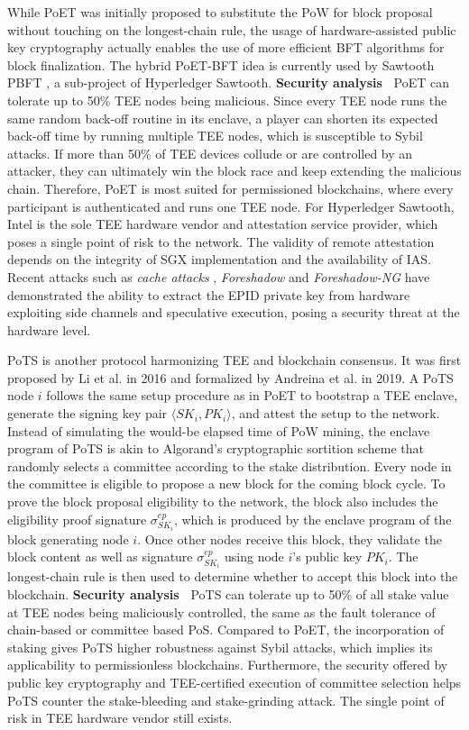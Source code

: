 While PoET was initially proposed to substitute the PoW for block proposal without touching on the longest-chain rule, the usage of hardware-assisted public key cryptography actually enables the use of more efficient BFT algorithms for block finalization. The hybrid PoET-BFT idea is currently used by Sawtooth PBFT , a sub-project of Hyperledger Sawtooth.
\textbf{Security analysis~} PoET can tolerate up to 50\% TEE nodes being malicious. Since every TEE node runs the same random back-off routine in its enclave, a player can shorten its expected back-off time by running multiple TEE nodes, which is susceptible to Sybil attacks. If more than 50\% of TEE devices collude or are controlled by an attacker, they can ultimately win the block race and keep extending the malicious chain. Therefore, PoET is most suited for permissioned blockchains, where every participant is authenticated and runs one TEE node.
For Hyperledger Sawtooth, Intel is the sole TEE hardware vendor and attestation service provider, which poses a single point of risk to the network. The validity of remote attestation depends on the integrity of SGX implementation and the availability of IAS. Recent attacks such as \textit{cache attacks} , \textit{Foreshadow}  and \textit{Foreshadow-NG}  have demonstrated the ability to extract the EPID private key from hardware exploiting side channels and speculative execution, posing a security threat at the hardware level.

PoTS is another protocol harmonizing TEE and blockchain consensus. It was first proposed by Li et al.  in 2016 and formalized by Andreina et al.  in 2019. A PoTS node $i$ follows the same setup procedure as in PoET to bootstrap a TEE enclave, generate the signing key pair $\langle SK_i,PK_i \rangle$, and attest the setup to the network. Instead of simulating the would-be elapsed time of PoW mining, the enclave program of PoTS is akin to Algorand's cryptographic sortition scheme that randomly selects a committee according to the stake distribution. Every node in the committee is eligible to propose a new block for the coming block cycle. To prove the block proposal eligibility to the network, the block also includes the eligibility proof signature $\sigma_{SK_i}^{ep}$, which is produced by the enclave program of the block generating node $i$. Once other nodes receive this block, they validate the block content as well as signature $\sigma_{SK_i}^{ep}$ using node $i$'s public key $PK_i$. The longest-chain rule is then used to determine whether to accept this block into the blockchain. 
\textbf{Security analysis~} PoTS can tolerate up to 50\% of all stake value at TEE nodes being maliciously controlled, the same as the fault tolerance of chain-based or committee based PoS. Compared to PoET, the incorporation of staking gives PoTS higher robustness against Sybil attacks, which implies its applicability to permissionless blockchains. Furthermore, the security offered by public key cryptography and TEE-certified execution of committee selection helps PoTS counter the stake-bleeding and stake-grinding attack. The single point of risk in TEE hardware vendor still exists.

